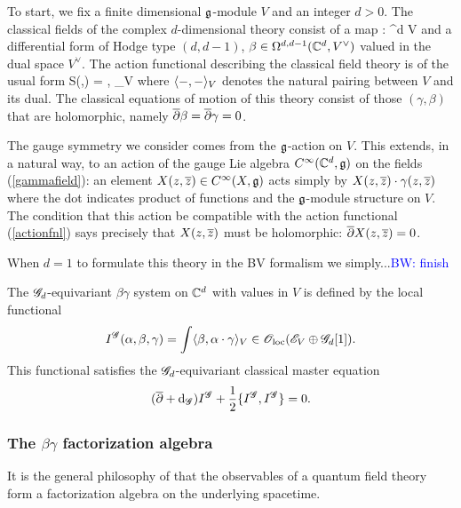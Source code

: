 \documentclass[10pt]{amsart}
\def\brian{\textcolor{blue}{BW: }\textcolor{blue}}
\begin{document}
To start, we fix a finite dimensional $\mathfrak g$-module $V$ and an integer $d > 0$.
The classical fields of the complex $d$-dimensional theory consist of a map
\beqn\label{gammafield}
\gamma : \CC^d \to V
\eeqn
and a differential form of Hodge type $(d,d-1)$, $\beta \in \Omega^{d,d-1}(\mathbb C^d, V^\vee)$ valued in the dual space $V^\vee$. 
The action functional describing the classical field theory is of the usual form
\beqn\label{actionfnl}
S(\gamma,\beta) = \int \<\beta, \dbar\gamma\>_V
\eeqn
where $\langle-,-\rangle_V$ denotes the natural pairing between $V$ and its dual. 
The classical equations of motion of this theory consist of those $(\gamma,\beta)$ that are holomorphic, namely $\overline{\partial} \beta = \overline{\partial} \gamma = 0$. 

The gauge symmetry we consider comes from the $\mathfrak g$-action on $V$. 
This extends, in a natural way, to an action of the gauge Lie algebra $C^\infty(\mathbb C^d, \mathfrak g)$ on the fields (\ref{gammafield}): an element $X(z,\overline{z}) \in C^\infty(X,\mathfrak g)$ acts simply by $X(z,\overline{z}) \cdot \gamma(z,\overline{z})$ where the dot indicates product of functions and the $\mathfrak g$-module structure on $V$. 
The condition that this action be compatible with the action functional (\ref{actionfnl}) says precisely that $X(z,\overline{z})$ must be holomorphic: $\overline{\partial} X(z,\overline{z}) = 0$. 

When $d=1$ to formulate this theory in the BV formalism we simply...\brian{finish}

\begin{dfn/lem}
The $\mathscr G_d$-equivariant $\beta\gamma$ system on $\mathbb C^d$ with values in $V$ is defined by the local functional
\[
I^{\mathscr G}(\alpha, \beta, \gamma) = \int \langle\beta, \alpha \cdot \gamma\rangle_V \in {\mathscr O}_{\rm loc}(\mathscr E_V \oplus \mathscr G_d[1]) .
\]
This functional satisfies the $\mathscr G_d$-equivariant classical master equation
\[
(\overline{\partial} + {\rm d}_{\mathscr G}) I^{\mathscr G} + \frac{1}{2} \{I^{\mathscr G}, I^{\mathscr G}\} = 0 .
\] 
\end{dfn/lem}

\subsubsection{The $\beta\gamma$ factorization algebra}

It is the general philosophy of \cite{CG1,CG2} that the observables of a quantum field theory form a factorization algebra on the underlying spacetime. 

\end{document}
